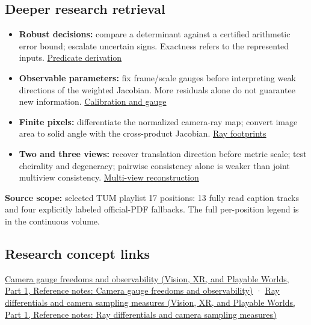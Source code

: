 \subsection{Deeper research retrieval}\label{appendix-a2b71a18f5a2-deeper-research-retrieval}

\hypertarget{appendix-a2b71a18f5a2-deeper-research-retrieval}{}

\begin{itemize}
\tightlist
\item
  \textbf{Robust decisions:} compare a determinant against a certified arithmetic error bound; escalate uncertain signs. Exactness refers to the represented inputs. \hyperref[02-foundations-ii-ch034-a-sign-can-matter-more-than-a-coordinate-robust-predicates]{Predicate derivation}
\item
  \textbf{Observable parameters:} fix frame/scale gauges before interpreting weak directions of the weighted Jacobian. More residuals alone do not guarantee new information. \hyperref[02-foundations-ii-ch036-calibration-needs-informative-observations-and-a-fixed-gauge]{Calibration and gauge}
\item
  \textbf{Finite pixels:} differentiate the normalized camera-ray map; convert image area to solid angle with the cross-product Jacobian. \hyperref[02-foundations-ii-ch036-a-camera-ray-carries-a-pixel-footprint]{Ray footprints}
\item
  \textbf{Two and three views:} recover translation direction before metric scale; test cheirality and degeneracy; pairwise consistency alone is weaker than joint multiview consistency. \hyperref[02-foundations-ii-ch036-calibrated-two-view-geometry-direction-before-distance]{Multi-view reconstruction}
\end{itemize}

\textbf{Source scope:} selected TUM playlist 17 positions: 13 fully read caption tracks and four explicitly labeled official-PDF fallbacks. The full per-position legend is in {the continuous volume}.

\subsection{Research concept links}\label{appendix-a2b71a18f5a2-research-concept-links}

\hypertarget{appendix-a2b71a18f5a2-research-concept-links}{}

\href{../07-Vision-XR-and-Playable-Worlds-P01/main.pdf\#nameddest=appendix-113f0267e5f4}{Camera gauge freedoms and observability (Vision, XR, and Playable Worlds, Part 1, Reference notes: Camera gauge freedoms and observability)} · \href{../07-Vision-XR-and-Playable-Worlds-P01/main.pdf\#nameddest=appendix-8c40fad29462}{Ray differentials and camera sampling measures (Vision, XR, and Playable Worlds, Part 1, Reference notes: Ray differentials and camera sampling measures)}
